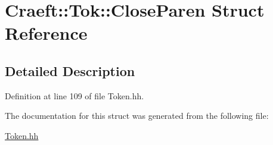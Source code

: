 \hypertarget{struct_craeft_1_1_tok_1_1_close_paren}{}\section{Craeft\+:\+:Tok\+:\+:Close\+Paren Struct Reference}
\label{struct_craeft_1_1_tok_1_1_close_paren}


\subsection{Detailed Description}


Definition at line 109 of file Token.\+hh.



The documentation for this struct was generated from the following file\+:\begin{DoxyCompactItemize}
\item 
\hyperlink{_token_8hh}{Token.\+hh}\end{DoxyCompactItemize}

